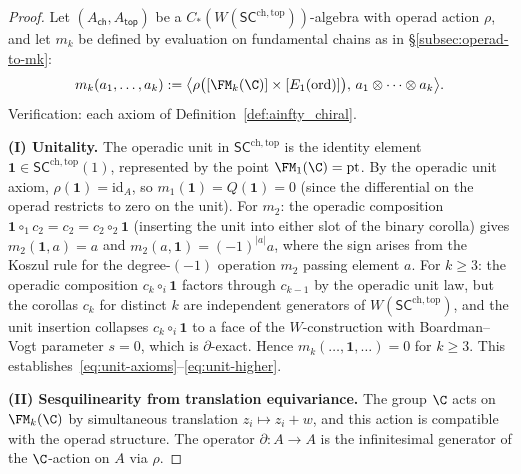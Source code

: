 \begin{proof}
Let $(A_{\mathsf{ch}}, A_{\mathsf{top}})$ be a $C_\ast(W(\mathsf{SC}^{\mathrm{ch,top}}))$-algebra with operad action $\rho$, and let $m_k$ be defined by evaluation on fundamental chains as in \S\ref{subsec:operad-to-mk}:
\[
m_k(a_1,\ldots,a_k) := \bigl\langle \rho\bigl([\FM_k(\C)] \times [E_1(\mathrm{ord})]\bigr),\, a_1 \otimes \cdots \otimes a_k \bigr\rangle.
\]
Verification: each axiom of Definition~\ref{def:ainfty_chiral}.

\medskip
\textbf{(I) Unitality.}
The operadic unit in $\mathsf{SC}^{\mathrm{ch,top}}$ is the identity element $\mathbf{1} \in \mathsf{SC}^{\mathrm{ch,top}}(1)$, represented by the point $\FM_1(\C) = \mathrm{pt}$. By the operadic unit axiom, $\rho(\mathbf{1}) = \mathrm{id}_A$, so $m_1(\mathbf{1}) = Q(\mathbf{1}) = 0$ (since the differential on the operad restricts to zero on the unit). For $m_2$: the operadic composition $\mathbf{1} \circ_1 c_2 = c_2 = c_2 \circ_2 \mathbf{1}$ (inserting the unit into either slot of the binary corolla) gives $m_2(\mathbf{1}, a) = a$ and $m_2(a, \mathbf{1}) = (-1)^{|a|} a$, where the sign arises from the Koszul rule for the degree-$(-1)$ operation $m_2$ passing element $a$. For $k \geq 3$: the operadic composition $c_k \circ_i \mathbf{1}$ factors through $c_{k-1}$ by the operadic unit law, but the corollas $c_k$ for distinct $k$ are independent generators of $W(\mathsf{SC}^{\mathrm{ch,top}})$, and the unit insertion collapses $c_k \circ_i \mathbf{1}$ to a face of the $W$-construction with Boardman--Vogt parameter $s = 0$, which is $\partial$-exact. Hence $m_k(\ldots, \mathbf{1}, \ldots) = 0$ for $k \geq 3$. This establishes~\eqref{eq:unit-axioms}--\eqref{eq:unit-higher}.

\medskip
\textbf{(II) Sesquilinearity from translation equivariance.}
The group $\C$ acts on $\FM_k(\C)$ by simultaneous translation $z_i \mapsto z_i + w$, and this action is compatible with the operad structure. The operator $\partial \colon A \to A$ is the infinitesimal generator of the $\C$-action on $A$ via $\rho$.


\end{proof}
